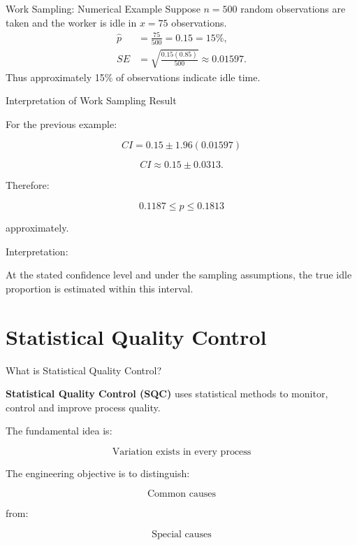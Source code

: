 \documentclass[aspectratio=169,10pt]{beamer}
\begin{document}

\begin{frame}{Work Sampling: Numerical Example}
\small
Suppose $n=500$ random observations are taken and the worker is idle in $x=75$ observations.
\begin{align*}
\hat p&=\frac{75}{500}=0.15=15\%,\\
SE&=\sqrt{\frac{0.15(0.85)}{500}}\approx0.01597.
\end{align*}
Thus approximately 15\% of observations indicate idle time.
\end{frame}


\begin{frame}[shrink=18]{Interpretation of Work Sampling Result}
\small

For the previous example:

\[
CI
=
0.15
\pm
1.96(0.01597)
\]

\[
CI
\approx
0.15\pm0.0313.
\]

Therefore:

\[
\boxed{
0.1187\le p\le0.1813
}
\]

approximately.

Interpretation:

At the stated confidence level and under the sampling assumptions,
the true idle proportion is estimated within this interval.

\end{frame}


\section{Statistical Quality Control}

\begin{frame}[shrink=18]{What is Statistical Quality Control?}
\small

\textbf{Statistical Quality Control (SQC)} uses statistical methods
to monitor, control and improve process quality.

The fundamental idea is:

\[
\boxed{
\text{Variation exists in every process}
}
\]

The engineering objective is to distinguish:

\[
\boxed{
\text{Common causes}
}
\]

from:

\[
\boxed{
\text{Special causes}
}
\]

\end{frame}
\end{document}

